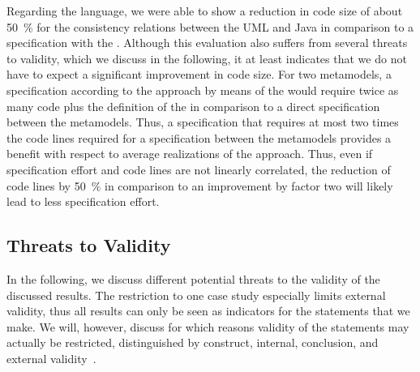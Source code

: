 Regarding the \commonalities language, we were able to show a reduction in code size of about \SI{50}{\percent} for the consistency relations between the \gls{UML} and Java in comparison to a specification with the \reactionslanguage.
Although this evaluation also suffers from several threats to validity, which we discuss in the following, it at least indicates that we do not have to expect a significant improvement in code size.
For two metamodels, a specification according to the \commonalities approach by means of the \reactionslanguage would require twice as many \reactions code plus the definition of the \conceptmetamodel in comparison to a direct \reactions specification between the metamodels.
Thus, a specification that requires at most two times the code lines required for a \reactions specification between the metamodels provides a benefit with respect to average realizations of the \commonalities approach.
Thus, even if specification effort and code lines are not linearly correlated, the reduction of code lines by \SI{50}{\percent} in comparison to an improvement by factor two will likely lead to less specification effort.


\subsection*{Threats to Validity}

In the following, we discuss different potential threats to the validity of the discussed results.
The restriction to one case study especially limits external validity, thus all results can only be seen as indicators for the statements that we make.
We will, however, discuss for which reasons validity of the statements may actually be restricted, distinguished by construct, internal, conclusion, and external validity~\cite{wohlin2012validity-Book}.

